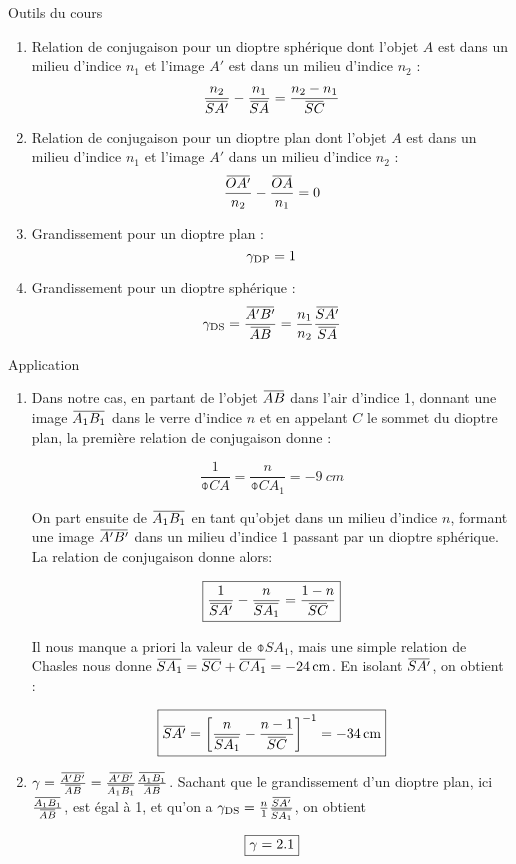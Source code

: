 \documentclass[10pt,a5paper,notitlepage]{book}
\begin{document}
\begin{NCdemo}{Outils du cours}
    \begin{enumerate}
        \item Relation de conjugaison pour un dioptre sphérique dont l'objet
            $A$ est dans un milieu d'indice $n_1$ et l'image $A'$ est dans un
            milieu d'indice $n_2$ :
            \[ \frac{n_2}{\SAp} - \frac{n_1}{\SA} = \frac{n_2 - n_1}{\SC}\]
        \item Relation de conjugaison pour un dioptre plan dont l'objet $A$ est
            dans un milieu d'indice $n_1$ et l'image $A'$ dans un milieu
            d'indice $n_2$ :
            \[ \frac{\OAp}{n_2} - \frac{\OA}{n_1} = 0 \]
        \item Grandissement pour un dioptre plan :
            \[ \gamma _{\text{DP}} = 1 \]
        \item Grandissement pour un dioptre sphérique :
            \[ \g \St{DS} = \frac{\ABp}{\ABb} = \frac{n_1}{n_2}
            \frac{\SAp}{\SA}\]
    \end{enumerate}
\end{NCdemo}

\begin{NCexem}{Application}
    \begin{enumerate}

        \item Dans notre cas, en partant de l'objet $\ABb$ dans l'air d'indice
            1, donnant une image $\ABa$ dans le verre d'indice $n$ et en
            appelant $C$ le sommet du dioptre plan, la première relation de
            conjugaison donne :

            \[ \boxed{ \frac{1}{\obar{CA}} = \frac{n}{\obar{CA_1}} =
            \SI{-9}{cm}} \]
            
            On part ensuite de $\ABa$ en tant qu'objet dans un milieu d'indice
            $n$, formant une image $\ABp$ dans un milieu d'indice 1 passant par
            un dioptre sphérique. La relation de conjugaison donne alors:
            
            \[ \boxed{ \frac{1}{\SAp} - \frac{n}{\obar{SA_1}} = \frac{1 -
            n}{\SC}}\]
            
            Il nous manque a priori la valeur de $\obar{SA_1}$, mais une simple
            relation de Chasles nous donne $\obar{SA_1} = \SC + \obar{CA_1} =
            \SI{-24}{cm}$. En isolant $\SAp$, on obtient :
            
            \[ \boxed{\SAp = \left[ \frac{n}{\obar{SA_1}} - \frac{n -
            1}{\SC}\right]^{-1} = \SI{-34}{cm}}\]

        \item $\g = \frac{\ABp}{\ABb} = \frac{\ABp}{\ABa} \frac{\ABa}{\ABb}$.
            Sachant que le grandissement d'un dioptre plan, ici $
            \frac{\ABa}{\ABb}$, est égal à 1, et qu'on a $\g \St{DS} =
            \frac{n}{1} \frac{\SAp}{\obar{SA_1}}$, on obtient

            \[ \boxed{\gamma = 2.1}\]
    \end{enumerate}
    \end{NCexem}
\end{document}
